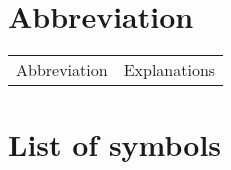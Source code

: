 \section*{Abbreviation}
\label{cha:Nomenclature}
\begin{table*}[h]
\begin{tabular}{ll}
	Abbreviation & Explanations \\
\end{tabular}
\end{table*}
\newpage
\section*{List of symbols}
\renewcommand{\nomname}{}
\printnomenclature